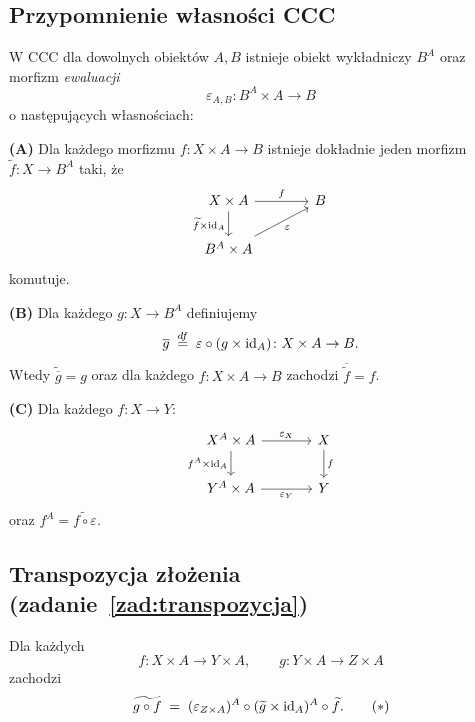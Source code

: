 \subsection*{Przypomnienie własności CCC}

W CCC dla dowolnych obiektów $A, B$ istnieje obiekt wykładniczy $B^A$ oraz morfizm \emph{ewaluacji}
\[
\varepsilon_{A,B} \colon B^A \times A \to B
\]
o następujących własnościach:

\textbf{(A)} Dla każdego morfizmu $f \colon X \times A \to B$ istnieje dokładnie jeden morfizm $\widetilde{f} \colon X \to B^A$ taki, że
\[
\begin{tikzcd}[column sep=large]
X \times A \arrow[r, "f"] \arrow[d, "\widetilde{f}\times \id_A"'] & B \\
B^A \times A \arrow[ur, "\varepsilon"'] &
\end{tikzcd}
\]
komutuje.

\textbf{(B)} Dla każdego $g \colon X \to B^A$ definiujemy
\[
\overline{g} \;\stackrel{df}{=}\; \varepsilon \circ (g \times \mathrm{id}_A) \colon X \times A \to B.
\]
Wtedy $\widetilde{\overline{g}} = g$ oraz dla każdego $f \colon X \times A \to B$ zachodzi $\overline{\widetilde{f}} = f$.

\textbf{(C)} Dla każdego $f \colon X \to Y$:
\[
\begin{tikzcd}[column sep=large]
X^A \times A \arrow[r, "\varepsilon_X"] \arrow[d, "f^A\times \id_A"'] & X \arrow[d, "f"] \\
Y^A \times A \arrow[r, "\varepsilon_Y"'] & Y
\end{tikzcd}
\]
oraz $f^A = \widetilde{f \circ \varepsilon}$.

\subsection*{Transpozycja złożenia (zadanie~\ref{zad:transpozycja})}

\begin{stwierdzenie}\label{stw:transpozycja-zlozenia}
Dla każdych
\[
f \colon X \times A \to Y \times A, \qquad g \colon Y \times A \to Z \times A
\]
zachodzi
\[
\widetilde{g \circ f} \;=\; (\varepsilon_{Z\times A})^A \circ (\widetilde{g} \times \mathrm{id}_A)^A \circ \widetilde{f}. \tag{$*$}
\]
\end{stwierdzenie}

